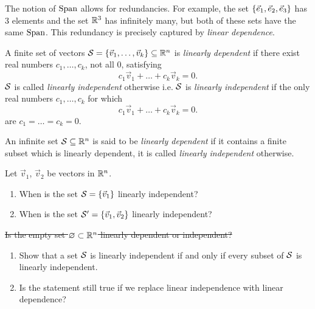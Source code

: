 The notion of $\operatorname{Span}$ allows for redundancies. For example, the set $\left\{\vec{e}_1, \vec{e}_2 , \vec{e}_3\right\}$ has 3 elements and the set $\mathbb{R}^3$ has infinitely many, but both of these sets have the same $\operatorname{Span}$.
This redundancy is precisely captured by \emph{linear dependence}.

\begin{definition}
  \label{def:linearIndependence}
  A finite set of vectors $\mathcal{S} = \left\{\vec {v}_1, \dots, \vec{v}_k\right\} \subseteq \mathbb{R}^n$ is \emph{linearly dependent} if there exist real numbers $c_1, \dots, c_k$, not all 0, satisfying
  \begin{equation*}
    c_1 \vec{v}_1 + \dots + c_k \vec{v}_k = 0.
  \end{equation*}
  $\mathcal{S}$ is called \emph{linearly independent} otherwise i.e. $\mathcal{S}$ is \emph{linearly independent} if the only real numbers $c_1, \dots, c_k$ for which
  \begin{equation*}
    c_1 \vec{v}_1 + \dots + c_k \vec{v}_k = 0.
  \end{equation*}
  are $c_1 = \dots = c_k = 0$.

  An infinite set $\mathcal{S} \subseteq \mathbb{R}^n$ is said to be \emph{linearly dependent} if it contains a finite subset which is linearly dependent, it is called \emph{linearly independent} otherwise.
\end{definition}

\begin{qbox}
  Let $\vec{v}_1$, $\vec{v}_2$ be vectors in $\mathbb{R}^n$.
  \begin{enumerate}
    \item When is the set $\mathcal{S} = \left\{\vec{v}_1\right\}$ linearly independent?
    \item When is the set $\mathcal{S}' = \left\{\vec{v}_1, \vec{v}_2\right\}$ linearly independent?
  \end{enumerate}
\end{qbox}

\begin{qbox}
  \sout{Is the empty set $\varnothing \subset \mathbb{R}^n$ linearly dependent or independent?}
\end{qbox}

\begin{qbox}
  \begin{enumerate}
    \item Show that a set $\mathcal{S}$ is linearly independent if and only if every subset of $\mathcal{S}$ is linearly independent.
    \item Is the statement still true if we replace linear independence with linear dependence?
  \end{enumerate}
\end{qbox}

